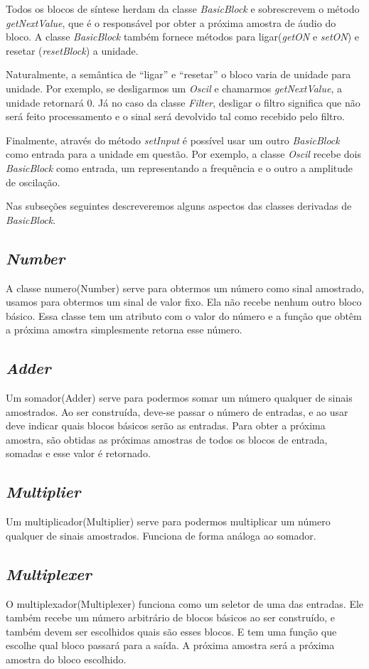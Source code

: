 \documentclass{article}
\begin{document}
Todos os blocos de síntese herdam da classe \emph{BasicBlock} e sobrescrevem 
o método \emph{getNextValue}, que é o responsável por obter a próxima 
amostra de áudio do bloco. A classe \emph{BasicBlock} também fornece métodos 
para ligar(\emph{getON} e \emph{setON}) e resetar (\emph{resetBlock}) a unidade.

Naturalmente, a semântica de ``ligar'' e ``resetar'' o bloco varia de unidade para unidade. 
Por exemplo, se desligarmos um \emph{Oscil} e chamarmos \emph{getNextValue}, a unidade 
retornará $0$. Já no caso da classe \emph{Filter}, desligar o filtro significa que não 
será feito processamento e o sinal será devolvido tal como recebido pelo filtro. 

Finalmente, através do método \emph{setInput} é possível usar um outro \emph{BasicBlock} 
como entrada para a unidade em questão. Por exemplo, a classe \emph{Oscil} recebe 
dois \emph{BasicBlock} como entrada, um representando a frequência e o outro 
a amplitude de oscilação.

Nas subseções seguintes descreveremos alguns aspectos das classes derivadas de \emph{BasicBlock}.

\subsection{\emph{Number}}
A classe numero(Number) serve para obtermos um número como sinal amostrado, usamos para obtermos um sinal de valor fixo. Ela não recebe nenhum outro bloco básico. Essa classe tem um atributo com o valor do número e a função que obtêm a próxima amostra simplesmente retorna esse número.
\subsection{\emph{Adder}}
Um somador(Adder) serve para podermos somar um número qualquer de sinais amostrados. Ao ser construída, deve-se passar o número de entradas, e ao usar deve indicar quais blocos básicos serão as entradas. Para obter a próxima amostra, são obtidas as próximas amostras de todos os blocos de entrada, somadas e esse valor é retornado.
\subsection{\emph{Multiplier}}
Um multiplicador(Multiplier) serve para podermos multiplicar um número qualquer de sinais amostrados. Funciona de forma análoga ao somador.
\subsection{\emph{Multiplexer}}
O multiplexador(Multiplexer) funciona como um seletor de uma das entradas. Ele também recebe um número arbitrário de blocos básicos ao ser construído, e também devem ser escolhidos quais são esses blocos. E tem uma função que escolhe qual bloco passará para a saída. A próxima amostra será a próxima amostra do bloco escolhido.
\end{document}
